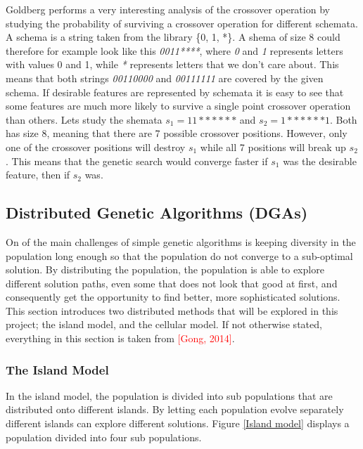 \noindent Goldberg performs a very interesting analysis of the crossover operation by studying the probability of surviving a crossover operation for different schemata. A schema is a string taken from the library \{0, 1, *\}.  A shema of size 8 could therefore for example look like this \textit{0011****}, where \textit{0} and \textit{1} represents letters with values 0 and 1, while \textit{*} represents letters that we don't care about. This means that both strings \textit{00110000} and \textit{00111111} are covered by the given schema. If desirable features are represented by schemata it is easy to see that some features are much more likely to survive a single point crossover operation than others. Lets study the shemata $s_1 = 11******$ and $s_2  = 1******1$. Both has size 8, meaning that there are 7 possible crossover positions. However, only one of the crossover positions will destroy $s_1$ while all 7 positions will break up $s_2$. This means that the genetic search would converge faster if $s_1$ was the desirable feature, then if $s_2$ was.


\subsection{Distributed Genetic Algorithms (DGAs)}
On of the main challenges of simple genetic algorithms is keeping diversity in the population long enough so that the population do not converge to a sub-optimal solution. By distributing the population, the population is able to explore different solution paths, even some that does not look that good at first, and consequently get the opportunity to find better, more sophisticated solutions. This section introduces two distributed methods that will be explored in this project; the island model, and the cellular model. If not otherwise stated, everything in this section is taken from \textcolor{red}{[Gong, 2014]}.


\subsubsection{The Island Model}
In the island model, the population is divided into sub populations that are distributed onto different islands. By letting each population evolve separately different islands can explore different solutions. Figure \ref{Island model} displays a population divided into four sub populations. \\ 




